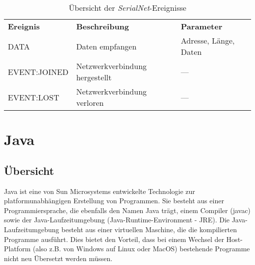                 \begin{table}
                    \begin{tabular}{lll}
                        \textbf{Ereignis} & \textbf{Beschreibung} & \textbf{Parameter}\\
                            DATA         & Daten empfangen & Adresse, Länge, Daten \\
                            EVENT:JOINED & Netzwerkverbindung hergestellt & --- \\
                            EVENT:LOST   & Netzwerkverbindung verloren & --- \\
                     \end{tabular}
                     \caption{Übersicht der \emph{SerialNet}-Ereignisse}
                     \label{serialnet_events}
                \end{table}

\section{Java}
    \subsection{Übersicht}

        Java ist eine von Sun Microsystems entwickelte Technologie zur platformunabhängigen 
        Erstellung von Programmen. Sie besteht aus einer Programmiersprache, die ebenfalls den Namen
        Java trägt, einem Compiler (javac) sowie der Java-Laufzeitumgebung (Java-Runtime-Environment - JRE).
        Die Java-Laufzeitumgebung besteht aus einer virtuellen Maschine, die die kompilierten Programme ausführt.
        Dies bietet den Vorteil, dass bei einem Wechsel der Host-Platform (also z.B. von Windows auf Linux oder MacOS) 
        bestehende Programme nicht neu Übersetzt werden müssen.\\

